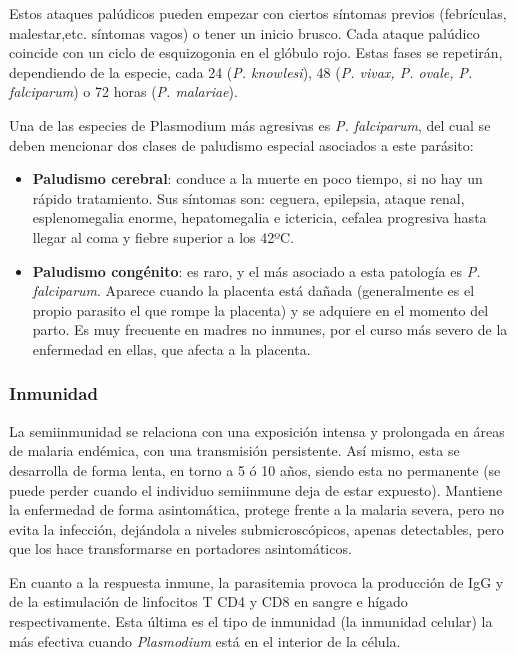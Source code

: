 Estos ataques palúdicos pueden empezar con ciertos síntomas previos (febrículas, malestar,etc. síntomas vagos) o tener un inicio brusco. Cada ataque palúdico coincide con un ciclo de esquizogonia en el glóbulo rojo. Estas fases se repetirán, dependiendo de la especie, cada 24 (\textit{P. knowlesi}), 48 (\textit{P. vivax, P. ovale, P. falciparum}) o 72 horas (\textit{P. malariae}).

Una de las especies de Plasmodium más agresivas es \textit{P. falciparum}, del cual se deben mencionar dos clases de paludismo especial asociados a este parásito:
\begin{itemize}[itemsep=0pt,parsep=0pt,topsep=0pt,partopsep=0pt]
	\item \textbf{Paludismo cerebral}: conduce a la muerte en poco tiempo, si no hay un rápido tratamiento. Sus síntomas son: ceguera, epilepsia, ataque renal, esplenomegalia enorme, hepatomegalia e ictericia, cefalea progresiva hasta llegar al coma y fiebre superior a los 42ºC.
	\item \textbf{Paludismo congénito}: es raro, y el más asociado a esta patología es \textit{P. falciparum}. Aparece cuando la placenta está dañada (generalmente es el propio parasito el que rompe la placenta) y se adquiere en el momento del parto. Es muy frecuente en madres no inmunes, por el curso más severo de la enfermedad en ellas, que afecta a la placenta.
\end{itemize}
\subsubsection{Inmunidad}
La semiinmunidad se relaciona con una exposición intensa y prolongada en áreas de malaria endémica, con una transmisión persistente. Así mismo, esta se desarrolla de forma lenta, en torno a 5 ó 10 años, siendo esta no permanente (se puede perder cuando el individuo semiinmune deja de estar expuesto). Mantiene la enfermedad de forma asintomática, protege frente a la malaria severa, pero no evita la infección, dejándola a niveles submicroscópicos, apenas detectables, pero que los hace transformarse en portadores asintomáticos.

En cuanto a la respuesta inmune, la parasitemia provoca la producción de IgG y de la estimulación de linfocitos T CD4 y CD8 en sangre e hígado respectivamente. Esta última es el tipo de inmunidad (la inmunidad celular) la más efectiva cuando \textit{Plasmodium} está en el interior de la célula.

